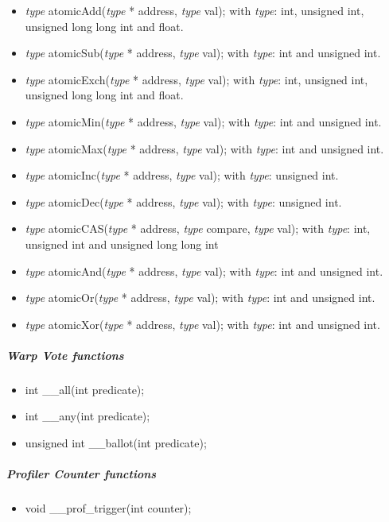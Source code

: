 \begin{itemize}
	\item \emph{type} atomicAdd(\emph{type} * address, \emph{type} val); with \emph{type}: int, unsigned int, unsigned long long int and float.
	\item \emph{type} atomicSub(\emph{type} * address, \emph{type} val); with \emph{type}: int and unsigned int.
	\item \emph{type} atomicExch(\emph{type} * address, \emph{type} val); with \emph{type}: int, unsigned int, unsigned long long int and float.
	\item \emph{type} atomicMin(\emph{type} * address, \emph{type} val); with \emph{type}: int and unsigned int.
	\item \emph{type} atomicMax(\emph{type} * address, \emph{type} val); with \emph{type}: int and unsigned int.
	\item \emph{type} atomicInc(\emph{type} * address, \emph{type} val); with \emph{type}: unsigned int.
	\item \emph{type} atomicDec(\emph{type} * address, \emph{type} val); with \emph{type}: unsigned int.
	\item \emph{type} atomicCAS(\emph{type} * address, \emph{type} compare, \emph{type} val); with \emph{type}: int, unsigned int and unsigned long long int
	\item \emph{type} atomicAnd(\emph{type} * address, \emph{type} val); with \emph{type}: int and unsigned int.
	\item \emph{type} atomicOr(\emph{type} * address, \emph{type} val); with \emph{type}: int and unsigned int.
	\item \emph{type} atomicXor(\emph{type} * address, \emph{type} val); with \emph{type}: int and unsigned int.
\end{itemize}

					\subparagraph{Warp Vote functions}

\begin{itemize}
	\item int \_\_all(int predicate);
	\item int \_\_any(int predicate);
	\item unsigned int \_\_ballot(int predicate);
\end{itemize}

					\subparagraph{Profiler Counter functions}

\begin{itemize}
	\item void \_\_prof\_trigger(int counter);
\end{itemize}

